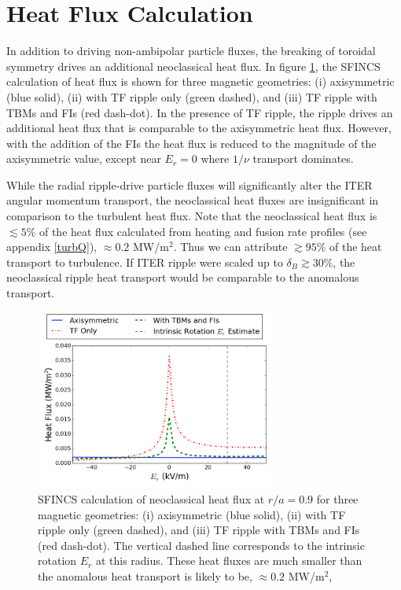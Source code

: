 \documentclass{article}
\numberwithin{figure}{section}
\numberwithin{equation}{section}
\begin{document}
\FloatBarrier

\section{Heat Flux Calculation}\label{heatflux}
In addition to driving non-ambipolar particle fluxes, the breaking of toroidal symmetry drives an additional neoclassical heat flux. In figure \ref{fig:HeatFlux}, the SFINCS calculation of heat flux is shown for three magnetic geometries: (i) axisymmetric (blue solid), (ii) with TF ripple only (green dashed), and (iii) TF ripple with TBMs and FIs (red dash-dot). In the presence of TF ripple, the ripple drives an additional heat flux that is comparable to the axisymmetric heat flux. However, with the addition of the FIs the heat flux is reduced to the magnitude of the axisymmetric value, except near $E_r = 0$ where $1/\nu$ transport dominates. 

While the radial ripple-drive particle fluxes will significantly alter the ITER angular momentum transport, the neoclassical heat fluxes are insignificant in comparison to the turbulent heat flux. Note that the neoclassical heat flux is $\lesssim 5\%$  of the heat flux calculated from heating and fusion rate profiles (see appendix \ref{turbQ}), $\approx 0.2$ MW/m$^2$. Thus we can attribute $\gtrsim 95\%$ of the heat transport to turbulence. If ITER ripple were scaled up to $\delta_B \gtrsim 30\%$, the neoclassical ripple heat transport would be comparable to the anomalous transport.

\begin{figure}[h!]
\centering
\includegraphics[width=0.7\textwidth]
{HeatFlux.png}
\caption{\label{fig:HeatFlux} SFINCS calculation of neoclassical heat flux at $r/a = 0.9$ for three magnetic geometries: (i) axisymmetric (blue solid), (ii) with TF ripple only (green dashed), and (iii) TF ripple with TBMs and FIs (red dash-dot). The vertical dashed line corresponds to the intrinsic rotation $E_r$ at this radius. These heat fluxes are much smaller than the anomalous heat transport is likely to be, $\approx 0.2$ MW/m$^2$,}
\end{figure}
\end{document}
